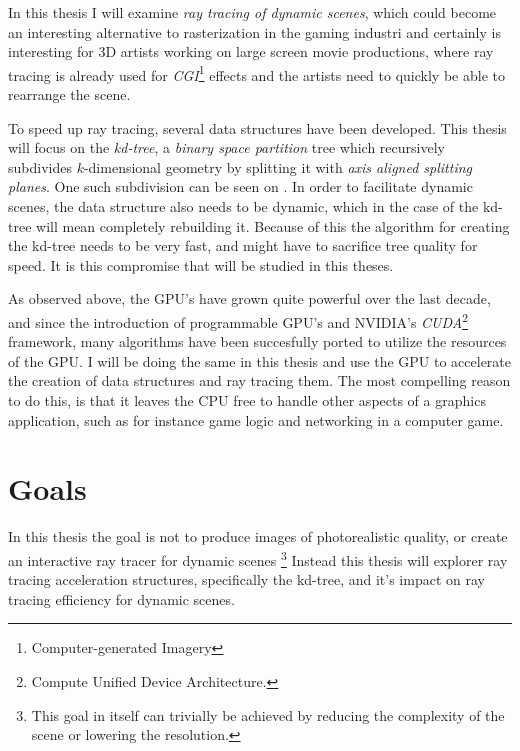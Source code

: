 
In this thesis I will examine \textit{ray tracing of dynamic scenes},
which could become an interesting alternative to rasterization in the
gaming industri and certainly is interesting for 3D artists working on
large screen movie productions, where ray tracing is already used for
\textit{CGI}\footnote{Computer-generated Imagery} effects and the
artists need to quickly be able to rearrange the scene.



To speed up ray tracing, several data structures have been
developed. This thesis will focus on the \textit{kd-tree}, a
\textit{binary space partition} tree which recursively subdivides
$k$-dimensional geometry by splitting it with \textit{axis aligned
  splitting planes}. One such subdivision can be seen on
. In order to facilitate dynamic scenes, the
data structure also needs to be dynamic, which in the case of the
kd-tree will mean completely rebuilding it. Because of this the
algorithm for creating the kd-tree needs to be very fast, and might
have to sacrifice tree quality for speed. It is this compromise that
will be studied in this theses.




As observed above, the GPU's have grown quite powerful over the last
decade, and since the introduction of programmable GPU's and
NVIDIA's \textit{CUDA}\footnote{Compute Unified Device Architecture.}
framework, many algorithms have been succesfully ported to utilize the
resources of the GPU. I will be doing the same in this thesis and use
the GPU to accelerate the creation of data structures and ray tracing
them. The most compelling reason to do this, is that it leaves the CPU
free to handle other aspects of a graphics application, such as for
instance game logic and networking in a computer game.



\section{Goals}

In this thesis the goal is not to produce images of photorealistic
quality, or create an interactive ray tracer for dynamic
scenes \footnote{This goal in itself can trivially be achieved by
  reducing the complexity of the scene or lowering the resolution.}
Instead this thesis will explorer ray tracing acceleration structures,
specifically the kd-tree, and it's impact on ray tracing efficiency
for dynamic scenes.

